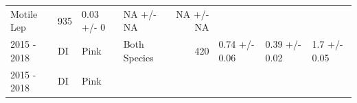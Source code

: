 \documentclass[fleqn,10pt]{wlpeerj} %
\begin{document}
\begin{longtable}[]{@{}llllrlll@{}}
\begin{minipage}[t]{0.11\columnwidth}
Motile Lep\strut
\end{minipage} & \begin{minipage}[t]{0.04\columnwidth}\raggedleft\strut
935\strut
\end{minipage} & \begin{minipage}[t]{0.14\columnwidth}\raggedright\strut
0.03 +/- 0\strut
\end{minipage} & \begin{minipage}[t]{0.14\columnwidth}\raggedright\strut
NA +/- NA\strut
\end{minipage} & \begin{minipage}[t]{0.14\columnwidth}\raggedright\strut
NA +/- NA\strut
\end{minipage}\tabularnewline
\begin{minipage}[t]{0.09\columnwidth}\raggedright\strut
2015 - 2018\strut
\end{minipage} & \begin{minipage}[t]{0.06\columnwidth}\raggedright\strut
DI\strut
\end{minipage} & \begin{minipage}[t]{0.06\columnwidth}\raggedright\strut
Pink\strut
\end{minipage} & \begin{minipage}[t]{0.11\columnwidth}\raggedright\strut
Both Species\strut
\end{minipage} & \begin{minipage}[t]{0.04\columnwidth}\raggedleft\strut
420\strut
\end{minipage} & \begin{minipage}[t]{0.14\columnwidth}\raggedright\strut
0.74 +/- 0.06\strut
\end{minipage} & \begin{minipage}[t]{0.14\columnwidth}\raggedright\strut
0.39 +/- 0.02\strut
\end{minipage} & \begin{minipage}[t]{0.14\columnwidth}\raggedright\strut
1.7 +/- 0.05\strut
\end{minipage}\tabularnewline
\begin{minipage}[t]{0.09\columnwidth}\raggedright\strut
2015 - 2018\strut
\end{minipage} & \begin{minipage}[t]{0.06\columnwidth}\raggedright\strut
DI\strut
\end{minipage} & \begin{minipage}[t]{0.06\columnwidth}\raggedright\strut
Pink\strut
\end{minipage} & \begin{minipage}[t]{0.11\columnwidth}\raggedright\strut

\end{minipage}
\end{longtable}
\end{document}
